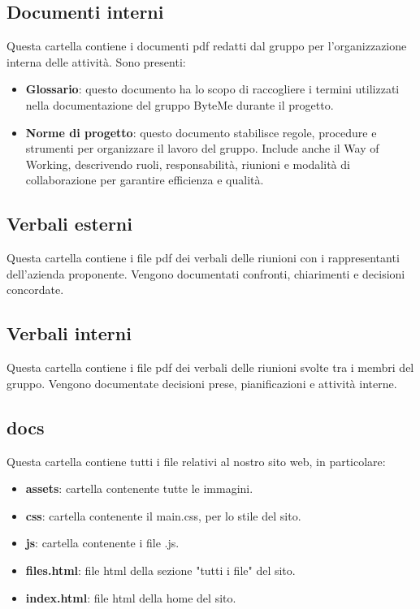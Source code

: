 \documentclass[11pt,a4paper]{article}
\begin{document}
\subsection{Documenti interni}
Questa cartella contiene i documenti pdf redatti dal gruppo per l’organizzazione interna delle attività. Sono presenti:
\begin{itemize}
\item \textbf{Glossario}: questo documento ha lo scopo di raccogliere i termini utilizzati nella documentazione del gruppo ByteMe durante il progetto.
\item \textbf{Norme di progetto}: questo documento stabilisce regole, procedure e strumenti per organizzare il lavoro del gruppo. Include anche il Way of Working, descrivendo ruoli, responsabilità, riunioni e modalità di collaborazione per garantire efficienza e qualità.
\end{itemize}

\subsection{Verbali esterni}
Questa cartella contiene i file pdf dei verbali delle riunioni con i rappresentanti dell'azienda proponente. Vengono documentati confronti, chiarimenti e decisioni concordate.

\subsection{Verbali interni}
Questa cartella contiene i file pdf dei verbali delle riunioni svolte tra i membri del gruppo. Vengono documentate decisioni prese, pianificazioni e attività interne.

\subsection{docs}
Questa cartella contiene tutti i file relativi al nostro sito web, in particolare:
\begin{itemize}
\item \textbf{assets}: cartella contenente tutte le immagini.
\item \textbf{css}: cartella contenente il main.css, per lo stile del sito.
\item \textbf{js}: cartella contenente i file .js.
\item \textbf{files.html}: file html della sezione "tutti i file" del sito.
\item \textbf{index.html}: file html della home del sito.
\end{itemize}
\end{document}
